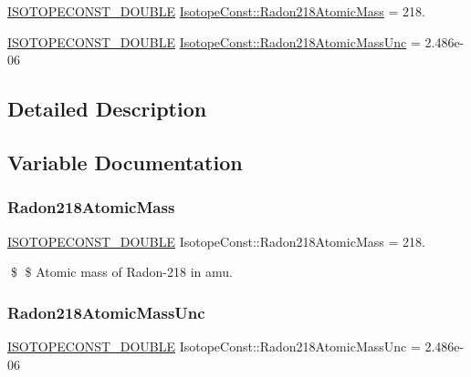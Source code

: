 \begin{DoxyCompactItemize}
\item 
\mbox{\hyperlink{group___isotope_const-_macros_ga8f45a7272ce02c0b4c65c44636ed719a}{I\+S\+O\+T\+O\+P\+E\+C\+O\+N\+S\+T\+\_\+\+D\+O\+U\+B\+LE}} \mbox{\hyperlink{group___isotope_const-_radon-_rn218_ga6a6767173a466b1572eaf89e18b30ec8}{Isotope\+Const\+::\+Radon218\+Atomic\+Mass}} = 218.
\item 
\mbox{\hyperlink{group___isotope_const-_macros_ga8f45a7272ce02c0b4c65c44636ed719a}{I\+S\+O\+T\+O\+P\+E\+C\+O\+N\+S\+T\+\_\+\+D\+O\+U\+B\+LE}} \mbox{\hyperlink{group___isotope_const-_radon-_rn218_gadae9d3befa5a8a15f55e74887992b836}{Isotope\+Const\+::\+Radon218\+Atomic\+Mass\+Unc}} = 2.\+486e-\/06
\end{DoxyCompactItemize}


\subsection{Detailed Description}


\subsection{Variable Documentation}
\mbox{\label{group___isotope_const-_radon-_rn218_ga6a6767173a466b1572eaf89e18b30ec8}} 
\subsubsection{\texorpdfstring{Radon218\+Atomic\+Mass}{Radon218AtomicMass}}
{\footnotesize\ttfamily \mbox{\hyperlink{group___isotope_const-_macros_ga8f45a7272ce02c0b4c65c44636ed719a}{I\+S\+O\+T\+O\+P\+E\+C\+O\+N\+S\+T\+\_\+\+D\+O\+U\+B\+LE}} Isotope\+Const\+::\+Radon218\+Atomic\+Mass = 218.}

\$ \$ Atomic mass of Radon-\/218 in amu. \mbox{\label{group___isotope_const-_radon-_rn218_gadae9d3befa5a8a15f55e74887992b836}} 
\subsubsection{\texorpdfstring{Radon218\+Atomic\+Mass\+Unc}{Radon218AtomicMassUnc}}
{\footnotesize\ttfamily \mbox{\hyperlink{group___isotope_const-_macros_ga8f45a7272ce02c0b4c65c44636ed719a}{I\+S\+O\+T\+O\+P\+E\+C\+O\+N\+S\+T\+\_\+\+D\+O\+U\+B\+LE}} Isotope\+Const\+::\+Radon218\+Atomic\+Mass\+Unc = 2.\+486e-\/06}

